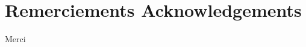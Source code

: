 \documentclass[../../Main_ManuscritThese.tex]{subfiles}
\begin{document}
\chapter*{Remerciements Acknowledgements}
\TitleBtwLines
{}
{}
\pagestyle{empty}


Merci



\markchapterend
\end{document}
